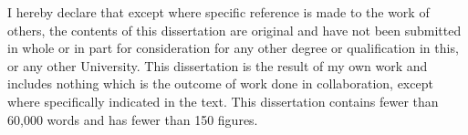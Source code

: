 
\begin{declaration}

I hereby declare that except where specific reference is made to the work of others, the contents of this dissertation are original and have not been submitted in whole or in part for consideration for any other degree or qualification in this, or any other University. This dissertation is the result of my own work and includes nothing which is the outcome of work done in collaboration, except where specifically indicated in the text. This dissertation contains fewer than 60,000 words
and has fewer than 150 figures.


\end{declaration}

